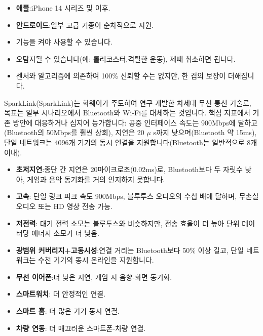 
\begin{itemize}
  \item \textbf{애플}:iPhone 14 시리즈 및 이후.
  \item \textbf{안드로이드}:일부 고급 기종이 순차적으로 지원.
\end{itemize}


\begin{itemize}
  \item 기능을 켜야 사용할 수 있습니다.
  \item 오탐지될 수 있습니다(예: 롤러코스터,격렬한 운동), 제때 취소하면 됩니다.
  \item 센서와 알고리즘에 의존하여 100\% 신뢰할 수는 없지만, 한 겹의 보장이 더해집니다.
\end{itemize}


SparkLink(SparkLink)는 화웨이가 주도하여 연구 개발한 차세대 무선 통신 기술로, 목표는 일부 시나리오에서 Bluetooth와 Wi-Fi를 대체하는 것입니다. 핵심 지표에서 기존 방안에 대응하거나 심지어 능가합니다: 공중 인터페이스 속도는 900Mbps에 달하고(Bluetooth의 50Mbps를 훨씬 상회), 지연은 20 $\mu$ s까지 낮으며(Bluetooth 약 15ms), 단일 네트워크는 4096개 기기의 동시 연결을 지원합니다(Bluetooth는 일반적으로 8개 이내).


\begin{itemize}
  \item \textbf{초저지연}:종단 간 지연은 20마이크로초(0.02ms)로, Bluetooth보다 두 자릿수 낮아, 게임과 음악 동기화를 거의 인지하지 못합니다.
  \item \textbf{고속}: 단일 링크 피크 속도 900Mbps, 블루투스 오디오의 수십 배에 달하며, 무손실 오디오 또는 HD 영상 전송 가능.
  \item \textbf{저전력}: 대기 전력 소모는 블루투스와 비슷하지만, 전송 효율이 더 높아 단위 데이터당 에너지 소모가 더 낮음.
  \item \textbf{광범위 커버리지+고동시성}:연결 거리는 Bluetooth보다 50\% 이상 길고, 단일 네트워크는 수천 기기의 동시 온라인을 지원합니다.
\end{itemize}


\begin{itemize}
  \item \textbf{무선 이어폰}:더 낮은 지연, 게임 시 음향-화면 동기화.
  \item \textbf{스마트워치}: 더 안정적인 연결.
  \item \textbf{스마트 홈}: 더 많은 기기 동시 연결.
  \item \textbf{차량 연동}: 더 매끄러운 스마트폰-차량 연결.
\end{itemize}

